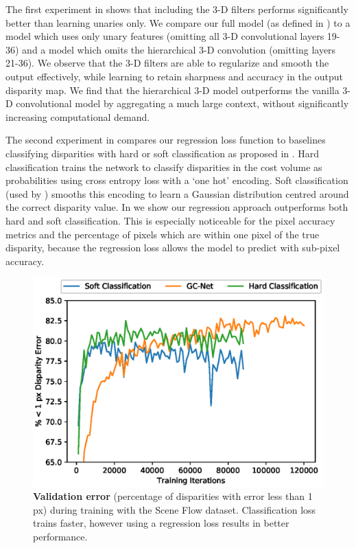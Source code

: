 The first experiment in  shows that including the 3-D filters performs significantly better than learning unaries only. We compare our full model (as defined in ) to a model which uses only unary features (omitting all 3-D convolutional layers 19-36) and a model which omits the hierarchical 3-D convolution (omitting layers 21-36).  We observe that the 3-D filters are able to regularize and smooth the output effectively, while learning to retain sharpness and accuracy in the output disparity map. We find that the hierarchical 3-D model outperforms the vanilla 3-D convolutional model by aggregating a much large context, without significantly increasing computational demand.

The second experiment in  compares our regression loss function to baselines classifying disparities with hard or soft classification as proposed in \citep{luo2016efficient}. Hard classification trains the network to classify disparities in the cost volume as probabilities using cross entropy loss with a `one hot' encoding. Soft classification (used by \citep{luo2016efficient}) smooths this encoding to learn a Gaussian distribution centred around the correct disparity value. In  we show our regression approach outperforms both hard and soft classification. This is especially noticeable for the pixel accuracy metrics and the percentage of pixels which are within one pixel of the true disparity, because the regression loss allows the model to predict with sub-pixel accuracy.

\begin{figure}[t]
\centering
\includegraphics[width=0.66\linewidth]{training_plot.eps}
\caption[Validation error during training with the Scene Flow dataset.]{\textbf{Validation error} (percentage of disparities with error less than 1 px) during training with the Scene Flow dataset. Classification loss trains faster, however using a regression loss results in better performance.}
\label{fig:training_err}
\end{figure}

